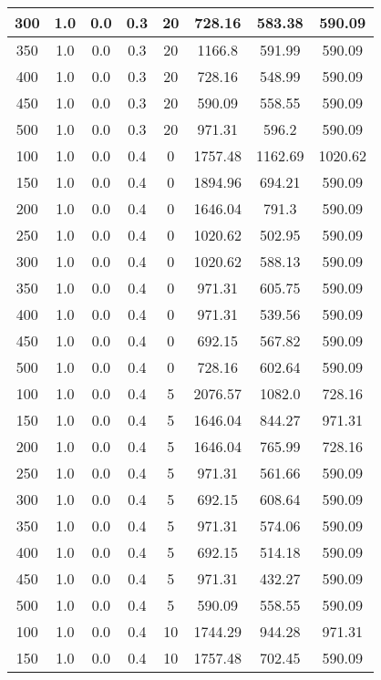 \documentclass[a4paper, 12pt]{extreport}
\begin{document}
\begin{itemize}
\begin{longtable}{|c|c|c|c|c|c|c|c|}
			300 & 1.0 & 0.0 & 0.3 & 20 & 728.16 & 583.38 & 590.09 \\\hline
			350 & 1.0 & 0.0 & 0.3 & 20 & 1166.8 & 591.99 & 590.09 \\\hline
			400 & 1.0 & 0.0 & 0.3 & 20 & 728.16 & 548.99 & 590.09 \\\hline
			450 & 1.0 & 0.0 & 0.3 & 20 & 590.09 & 558.55 & 590.09 \\\hline
			500 & 1.0 & 0.0 & 0.3 & 20 & 971.31 & 596.2 & 590.09 \\\hline
			100 & 1.0 & 0.0 & 0.4 & 0 & 1757.48 & 1162.69 & 1020.62 \\\hline
			150 & 1.0 & 0.0 & 0.4 & 0 & 1894.96 & 694.21 & 590.09 \\\hline
			200 & 1.0 & 0.0 & 0.4 & 0 & 1646.04 & 791.3 & 590.09 \\\hline
			250 & 1.0 & 0.0 & 0.4 & 0 & 1020.62 & 502.95 & 590.09 \\\hline
			300 & 1.0 & 0.0 & 0.4 & 0 & 1020.62 & 588.13 & 590.09 \\\hline
			350 & 1.0 & 0.0 & 0.4 & 0 & 971.31 & 605.75 & 590.09 \\\hline
			400 & 1.0 & 0.0 & 0.4 & 0 & 971.31 & 539.56 & 590.09 \\\hline
			450 & 1.0 & 0.0 & 0.4 & 0 & 692.15 & 567.82 & 590.09 \\\hline
			500 & 1.0 & 0.0 & 0.4 & 0 & 728.16 & 602.64 & 590.09 \\\hline
			100 & 1.0 & 0.0 & 0.4 & 5 & 2076.57 & 1082.0 & 728.16 \\\hline
			150 & 1.0 & 0.0 & 0.4 & 5 & 1646.04 & 844.27 & 971.31 \\\hline
			200 & 1.0 & 0.0 & 0.4 & 5 & 1646.04 & 765.99 & 728.16 \\\hline
			250 & 1.0 & 0.0 & 0.4 & 5 & 971.31 & 561.66 & 590.09 \\\hline
			300 & 1.0 & 0.0 & 0.4 & 5 & 692.15 & 608.64 & 590.09 \\\hline
			350 & 1.0 & 0.0 & 0.4 & 5 & 971.31 & 574.06 & 590.09 \\\hline
			400 & 1.0 & 0.0 & 0.4 & 5 & 692.15 & 514.18 & 590.09 \\\hline
			450 & 1.0 & 0.0 & 0.4 & 5 & 971.31 & 432.27 & 590.09 \\\hline
			500 & 1.0 & 0.0 & 0.4 & 5 & 590.09 & 558.55 & 590.09 \\\hline
			100 & 1.0 & 0.0 & 0.4 & 10 & 1744.29 & 944.28 & 971.31 \\\hline
			150 & 1.0 & 0.0 & 0.4 & 10 & 1757.48 & 702.45 & 590.09 \\\hline

\end{longtable}
\end{itemize}
\end{document}

